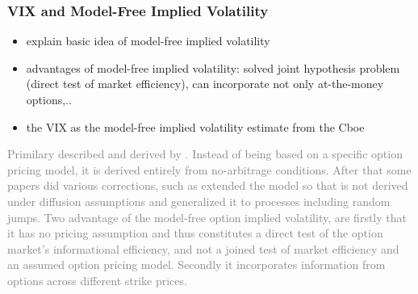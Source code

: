 \subsubsection{VIX and Model-Free Implied Volatility}
\begin{itemize}\itemsep0pt
\item explain basic idea of model-free implied volatility
\item advantages of model-free implied volatility: solved joint hypothesis problem (direct test of market efficiency), can incorporate not only at-the-money options,..
\item the VIX as the model-free implied volatility estimate from the Cboe 
\end{itemize}

\textcolor{gray}{
Primilary described and derived by \citeauthor{britten2000}. Instead of being based on a specific option pricing model, it is derived entirely from no-arbitrage conditions. After that some papers did various corrections, such as \citeauthor{jiang2003} extended the model so that is not derived under diffusion assumptions and generalized it to processes including random jumps. Two advantage of the model-free option implied volatility, are firstly that it has no pricing assumption and thus constitutes a direct test of the option market's informational efficiency, and not a joined test of market efficiency and an assumed option pricing model. Secondly it incorporates information from options across different strike prices. }
